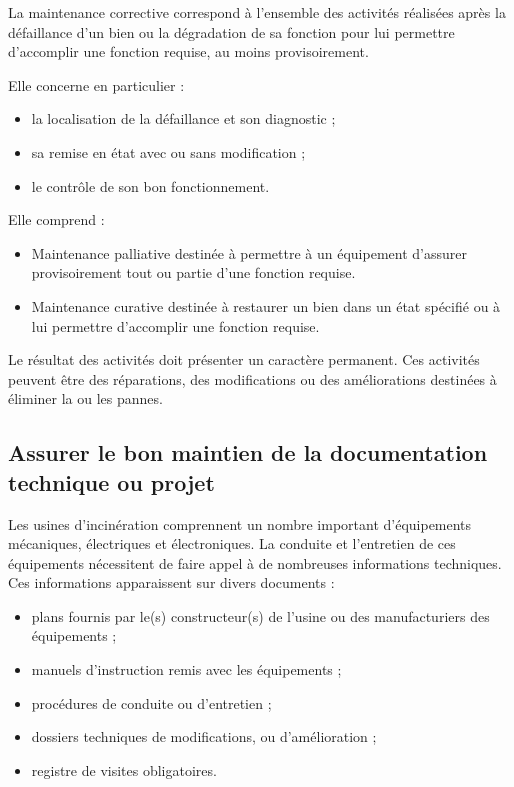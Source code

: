 \vspace{0.3cm} 


La maintenance corrective correspond à l’ensemble des activités réalisées après la défaillance d’un bien ou la dégradation de sa fonction pour lui permettre d’accomplir une fonction requise, au moins provisoirement.
\vspace{0.3cm} 

Elle concerne en particulier :

\begin{itemize}
\item la localisation de la défaillance et son diagnostic ;
\item sa remise en état avec ou sans modification ;
\item le contrôle de son bon fonctionnement.
\end{itemize}

\vspace{0.3cm}

Elle comprend :
\begin{itemize}
\item 	Maintenance palliative destinée à permettre à un équipement d'assurer provisoirement tout ou partie d'une fonction requise.
\item 	Maintenance curative destinée à restaurer un bien dans un état spécifié ou à lui permettre d'accomplir une fonction requise.
\end{itemize}

Le résultat des activités doit présenter un caractère permanent. Ces activités peuvent être des réparations, des modifications ou des améliorations destinées à éliminer la ou les pannes.






\subsection{Assurer le bon maintien de la documentation technique ou projet } 

Les usines d’incinération comprennent un nombre important d’équipements mécaniques, électriques et électroniques. La conduite et l’entretien de ces équipements nécessitent de faire appel à de nombreuses informations techniques. Ces informations apparaissent sur divers documents :

\begin{itemize}
\item plans fournis par le(s) constructeur(s) de l’usine ou des manufacturiers des équipements ;
\item manuels d’instruction remis avec les équipements ;
\item procédures de conduite ou d’entretien ;
\item dossiers techniques de modifications, ou d’amélioration ;
\item registre de visites obligatoires.
\end{itemize}

